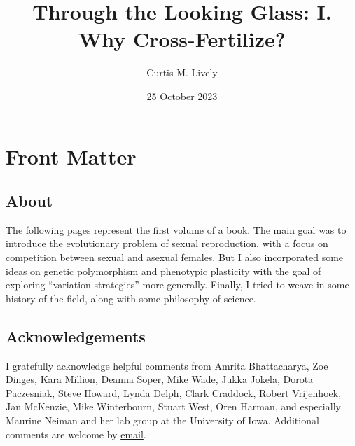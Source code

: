 \documentclass[
  letterpaper,
]{book}
\title{Through the Looking Glass: I. Why Cross-Fertilize?}
\author{Curtis M. Lively}
\date{25 October 2023}
\renewcommand*\contentsname{Table of contents}
\newcommand\contentsname{Table of contents}
\begin{document}
\frontmatter
\maketitle
\ifdefined\Shaded\renewenvironment{Shaded}{\begin{tcolorbox}[frame hidden, breakable, interior hidden, borderline west={3pt}{0pt}{shadecolor}, boxrule=0pt, enhanced, sharp corners]}{\end{tcolorbox}}\fi

\renewcommand*\contentsname{Contents}
{
\hypersetup{linkcolor=}
\setcounter{tocdepth}{2}
\tableofcontents
}
\listoffigures
\listoftables
\mainmatter
{}

\hypertarget{front-matter}{%
\chapter*{Front Matter}\label{front-matter}}


\hypertarget{about}{%
\section*{About}\label{about}}


The following pages represent the first volume of a book. The main goal
was to introduce the evolutionary problem of sexual reproduction, with a
focus on competition between sexual and asexual females. But I also
incorporated some ideas on genetic polymorphism and phenotypic
plasticity with the goal of exploring ``variation strategies'' more
generally. Finally, I tried to weave in some history of the field, along
with some philosophy of science.

\hypertarget{acknowledgements}{%
\section*{Acknowledgements}\label{acknowledgements}}


I gratefully acknowledge helpful comments from Amrita Bhattacharya, Zoe
Dinges, Kara Million, Deanna Soper, Mike Wade, Jukka Jokela, Dorota
Paczesniak, Steve Howard, Lynda Delph, Clark Craddock, Robert
Vrijenhoek, Jan McKenzie, Mike Winterbourn, Stuart West, Oren Harman,
and especially Maurine Neiman and her lab group at the University of
Iowa. Additional comments are welcome by
\href{mailto:clively@indiana.edu}{email}.
\end{document}
